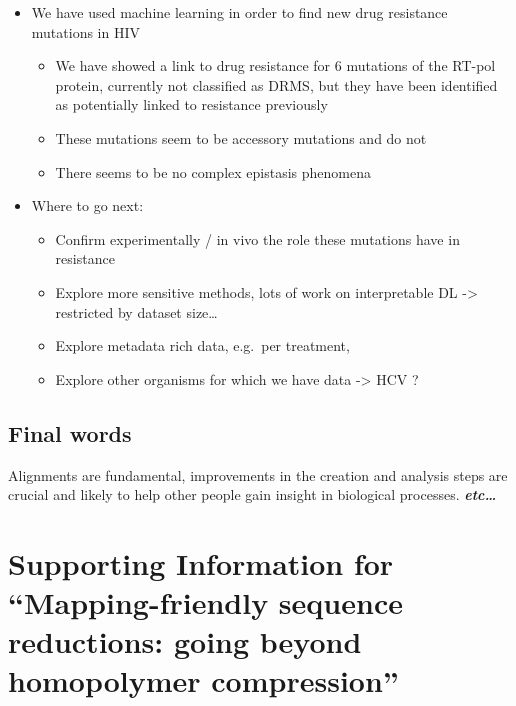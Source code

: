 \documentclass[
  11pt,
  twoside,
  BCOR=10mm,
  listof=totoc]{scrbook}
\begin{document}
\begin{itemize}
\item
  We have used machine learning in order to find new drug resistance mutations in HIV

  \begin{itemize}
  \item
    We have showed a link to drug resistance for 6 mutations of the RT-pol protein, currently not classified as DRMS, but they have been identified as potentially linked to resistance previously
  \item
    These mutations seem to be accessory mutations and do not
  \item
    There seems to be no complex epistasis phenomena
  \end{itemize}
\item
  Where to go next:

  \begin{itemize}
  \item
    Confirm experimentally / in vivo the role these mutations have in resistance
  \item
    Explore more sensitive methods, lots of work on interpretable DL -\textgreater{} restricted by dataset size\ldots{}
  \item
    Explore metadata rich data, e.g.~per treatment,
  \item
    Explore other organisms for which we have data -\textgreater{} HCV ?
  \end{itemize}
\end{itemize}

\hypertarget{final-words}{%
\section*{Final words}\label{final-words}}

Alignments are fundamental, improvements in the creation and analysis steps are crucial and likely to help other people gain insight in biological processes. \textbf{\emph{etc\ldots{}}}

\appendix


\hypertarget{HPC-appendix}{%
\chapter{Supporting Information for ``Mapping-friendly sequence reductions: going beyond homopolymer compression''}\label{HPC-appendix}}
\end{document}

